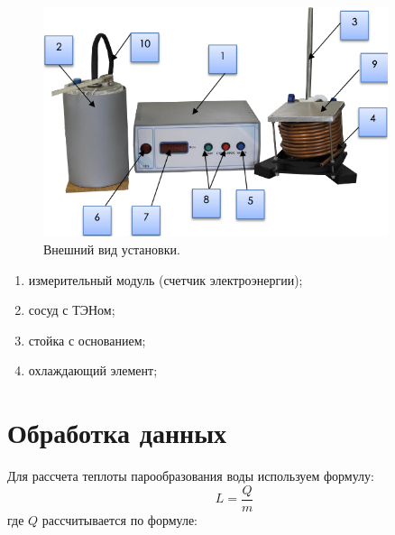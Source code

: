\documentclass[a4paper]{article}
\begin{document}
\begin{figure}[H]
    \centering
    \includegraphics[width=0.9\textwidth]{fig_1.png} 
    \caption{Внешний вид установки.}
    \label{fig:setup}
\end{figure}

\begin{enumerate}
    \item измерительный модуль (счетчик электроэнергии);
    \item сосуд с ТЭНом;
    \item стойка с основанием;
    \item охлаждающий элемент;
\end{enumerate}
\section{Обработка данных}
Для рассчета теплоты парообразования воды используем формулу:
\[
    L = \frac{Q}{m}
\]
где $Q$ рассчитывается по формуле:
\end{document}
